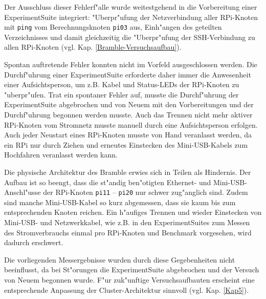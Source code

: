 \noindent 
Der Ausschluss dieser Fehlerf"alle wurde weitestgehend in die Vorbereitung einer ExperimentSuite integriert: "Uberpr"ufung der Netzverbindung aller RPi-Knoten mit \texttt{ping} vom Berechnungsknoten \texttt{pi03} aus, Einh"angen des geteilten Verzeichnisses und damit gleichzeitig die  "Uberpr"ufung der SSH-Verbindung zu allen RPi-Knoten (vgl. Kap. \ref{Bramble-Versuchsaufbau}). 

Spontan auftretende Fehler konnten nicht im Vorfeld ausgeschlossen werden. Die Durchf"uhrung einer ExperimentSuite erforderte daher immer die Anwesenheit einer Aufsichtsperson, um z.B. Kabel und Status-LEDs der RPi-Knoten zu "uberpr"ufen. Trat ein spontaner Fehler auf, musste die Durchf"uhrung der ExperimentSuite abgebrochen und von Neuem mit den Vorbereitungen und der Durchf"uhrung begonnen werden musste. Auch das Trennen nicht mehr aktiver RPi-Knoten vom Stromnetz musste manuell durch eine Aufsichtsperson erfolgen. Auch jeder Neustart eines RPi-Knoten musste von Hand veranlasst werden, da ein RPi nur durch Ziehen und erneutes Einstecken des Mini-USB-Kabels zum Hochfahren veranlasst werden kann. 

Die physische Architektur des Bramble erwies sich in Teilen als Hindernis. Der Aufbau ist so beengt, dass die st"andig ben"otigten Ethernet- und Mini-USB-Anschl"usse der RPi-Knoten \texttt{pi11} -- \texttt{pi20} nur schwer zug"anglich sind. Zudem sind manche Mini-USB-Kabel so kurz abgemessen, dass sie kaum bis zum entsprechenden Knoten reichen. Ein h"aufiges Trennen und wieder Einstecken von Mini-USB- und Netzwerkkabel, wie z.B. in den ExperimentSuites zum Messen des Stromverbrauchs einmal pro RPi-Knoten und Benchmark vorgesehen, wird dadurch erschwert. 

Die vorliegenden Messergebnisse wurden durch diese Gegebenheiten nicht beeinflusst, da bei St"orungen die ExperimentSuite abgebrochen und der Versuch von Neuem begonnen wurde. F"ur zuk"unftige Versuchsaufbauten erscheint eine entsprechende Anpassung der Cluster-Architektur sinnvoll (vgl. Kap. \ref{Kap5}).
\endinput 